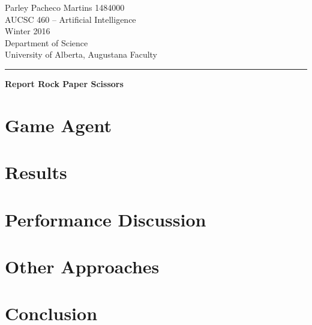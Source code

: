 \documentclass[12pt]{article}
\begin{document}
\noindent
Parley Pacheco Martins 1484000\\
AUCSC 460 -- Artificial Intelligence\\
Winter 2016\\
Department of Science\\
University of Alberta, Augustana Faculty

\vspace*{0.75\baselineskip}
\hrule
\vspace*{0.75\baselineskip}

\noindent
{\Large\bf Report Rock Paper Scissors }



\section{Game Agent}

\section{Results}

\section{Performance Discussion}

\section{Other Approaches}

\section{Conclusion}
\end{document}
